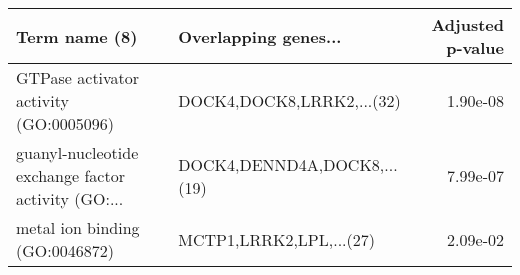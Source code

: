 \begin{tabular}{llr}
\toprule
                                     Term name (8) &        Overlapping genes... &  Adjusted p-value \\
\midrule
            GTPase activator activity (GO:0005096) &   DOCK4,DOCK8,LRRK2,...(32) &          1.90e-08 \\
guanyl-nucleotide exchange factor activity (GO:... & DOCK4,DENND4A,DOCK8,...(19) &          7.99e-07 \\
                    metal ion binding (GO:0046872) &     MCTP1,LRRK2,LPL,...(27) &          2.09e-02 \\
\bottomrule
\end{tabular}
